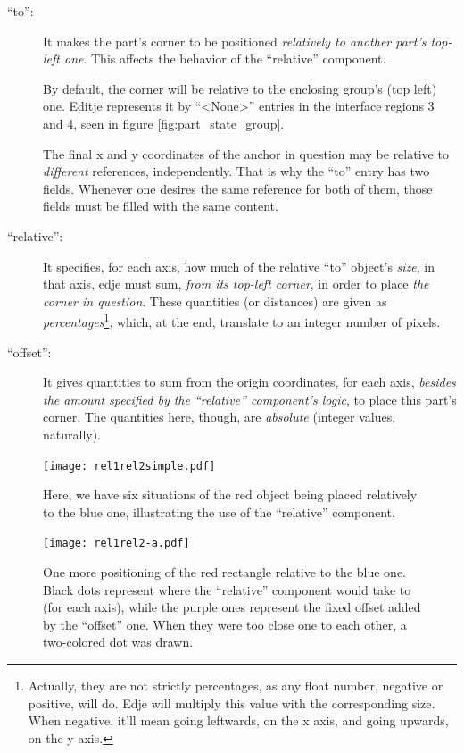 \documentclass[a4paper]{profusion}
\begin{document}
\begin{description}
\item[``to'':] It makes the part's corner to be positioned
  \emph{relatively to another part's top-left one}. This affects the
  behavior of the ``relative'' component.

  By default, the corner will be relative to the enclosing group's
  (top left) one. Editje represents it by ``<None>'' entries in the
  interface regions 3 and 4, seen in figure
  \ref{fig:part_state_group}.

  The final x and y coordinates of the anchor in question may be
  relative to \emph{different} references, independently. That is why
  the ``to'' entry has two fields. Whenever one desires the same
  reference for both of them, those fields must be filled with the
  same content.

\item[``relative'':] It specifies, for each axis, how much of the
  relative ``to'' object's \emph{size}, in that axis, edje must sum,
  \emph{from its top-left corner}, in order to place \emph{the corner
    in question}. These quantities (or distances) are given as
  \emph{percentages}\footnote{Actually, they are not strictly
    percentages, as any float number, negative or positive, will
    do. Edje will multiply this value with the corresponding size.
    When negative, it'll mean going leftwards, on the x axis, and
    going upwards, on the y axis.}, which, at the end, translate to an
  integer number of pixels.

\item[``offset'':] It gives quantities to sum from the origin
  coordinates, for each axis, \emph{besides the amount specified by
    the ``relative'' component's logic}, to place this part's
  corner. The quantities here, though, are \emph{absolute} (integer
  values, naturally).
\end{description}

\begin{figure}
  \centering
  \texttt{[image: rel1rel2simple.pdf]}
  \caption{Here, we have six situations of the red object being placed
    relatively to the blue one, illustrating the use of the
    ``relative'' component.}
  \label{fig:rel1rel2simple}
\end{figure}

\begin{figure}
  \centering
  \texttt{[image: rel1rel2-a.pdf]}
  \caption{One more positioning of the red rectangle relative to the
    blue one. Black dots represent where the ``relative'' component
    would take to (for each axis), while the purple ones represent the
    fixed offset added by the ``offset'' one. When they were too close
    one to each other, a two-colored dot was drawn.}
  \label{fig:rel1rel2-a}
\end{figure}
\end{document}
